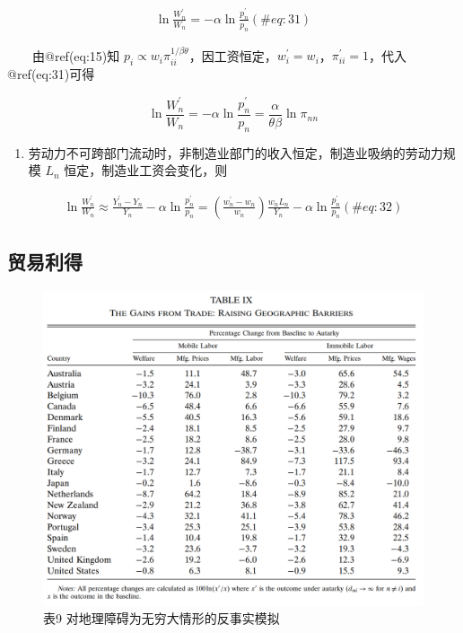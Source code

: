\documentclass[]{tufte-handout}
\providecommand{\tightlist}{%
  \setlength{\itemsep}{0pt}\setlength{\parskip}{0pt}}
\begin{document}
\begin{align}
\ln \frac{W_{n}^{\prime}}{W_{n}}=-\alpha \ln \frac{p_{n}^{\prime}}{p_{n}} (\#eq:31)
\end{align}

　　由@ref(eq:15)知
\(p_i \propto w_i \pi_{ii}^{1/{\beta \theta}}\)，因工资恒定，\(w_i^{\prime} = w_i\)，\(\pi_{ii}^{\prime}=1\)，代入@ref(eq:31)可得

\[
\ln \frac{W_{n}^{\prime}}{W_{n}}=-\alpha \ln \frac{p_{n}^{\prime}}{p_{n}} =\frac{\alpha}{\theta \beta} \ln \pi_{nn}
\]

\begin{enumerate}
\def\labelenumi{\arabic{enumi}.}
\setcounter{enumi}{1}
\tightlist
\item
  劳动力不可跨部门流动时，非制造业部门的收入恒定，制造业吸纳的劳动力规模
  \(L_n\) 恒定，制造业工资会变化，则
\end{enumerate}

\begin{align}
\ln \frac{W_{n}^{\prime}}{W_{n}} \approx \frac{Y_{n}^{\prime}-Y_{n}}{Y_{n}}-\alpha \ln \frac{p_{n}^{\prime}}{p_{n}} =\left(\frac{w_{n}^{\prime}-w_{n}}{w_{n}}\right) \frac{w_{n} L_{n}}{Y_{n}}-\alpha \ln \frac{p_{n}^{\prime}}{p_{n}} (\#eq:32)
\end{align}

\hypertarget{ux8d38ux6613ux5229ux5f97}{%
\subsection{贸易利得}\label{ux8d38ux6613ux5229ux5f97}}

\begin{figure}

{\centering \includegraphics[width=1\linewidth]{Figures/Table9} 

}

\caption[表9 对地理障碍为无穷大情形的反事实模拟]{表9 对地理障碍为无穷大情形的反事实模拟}\label{fig:t9}
\end{figure}
\end{document}
